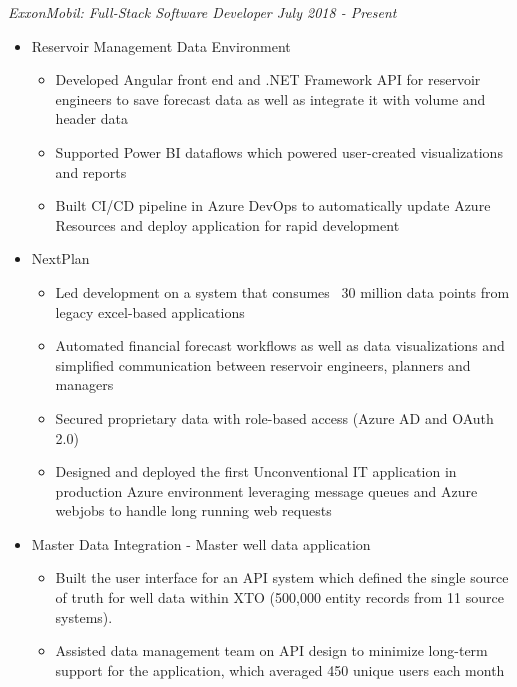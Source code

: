 \documentclass[line,overlapped]{res}
\begin{document}
\begin{resume}
  {\sl ExxonMobil: Full-Stack Software Developer \hfill July 2018 - \sl Present}
  \begin{itemize}[leftmargin=*]   %
    \item[] Reservoir Management Data Environment
      \begin{itemize}
        \setlength\itemsep{.1em}
        \item Developed Angular front end and .NET Framework API for reservoir engineers to save forecast data as well as integrate it with volume and header data
        \item Supported Power BI dataflows which powered user-created visualizations and reports
        \item Built CI/CD pipeline in Azure DevOps to automatically update Azure Resources and deploy application for rapid development
      \end{itemize}
      \setlength\itemsep{.1em}
    \item[] NextPlan
      \begin{itemize}
        \setlength\itemsep{.1em}
        \item Led development on a system that consumes ~30 million data points from legacy excel-based applications
        \item Automated financial forecast workflows as well as data visualizations and simplified communication between reservoir engineers, planners and managers
        \item Secured proprietary data with role-based access (Azure AD and OAuth 2.0)
        \item Designed and deployed the first Unconventional IT application in production Azure environment leveraging message queues and Azure webjobs to handle long running web requests
      \end{itemize}
    \item[] Master Data Integration - Master well data application
      \begin{itemize}
        \setlength\itemsep{.1em}
        \item Built the user interface for an API system which defined the single source of truth for well data within XTO (500,000 entity records from 11 source systems).
        \item Assisted data management team on API design to minimize long-term support for the application, which averaged 450 unique users each month
      \end{itemize}

\end{itemize}
\end{resume}
\end{document}
